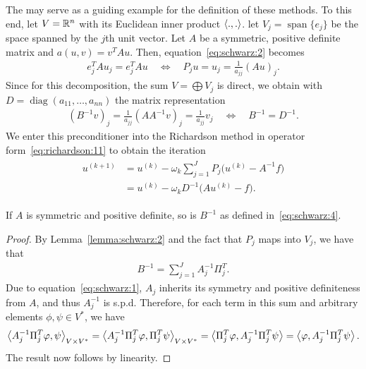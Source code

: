 \begin{example}
  \label{example:schwarz:Jacobi}
  The  may serve as a guiding example for the
  definition of these methods. To this end, let $V = \mathbb R^n$ with its
  Euclidean inner product $\scal(.,.)$. let $V_j =
  \operatorname{span}\{e_j\}$ be the space spanned by the $j$th unit
  vector. Let $A$ be a symmetric, positive definite matrix and $a(u,v)
  = v^T A u$. Then, equation~\eqref{eq:schwarz:2} becomes
  \begin{gather}
    \label{eq:schwarz:27}
    e_j^T A u_j = e_j^T A u
    \quad \Leftrightarrow \quad
    P_j u = u_j = \frac1{a_{j j}}(A u)_j.
  \end{gather}
  Since for this decomposition, the sum $V=\bigoplus V_j$ is direct,
  we obtain with $D=\operatorname{diag}(a_{11},\dots,a_{n n})$ the
  matrix representation
  \begin{gather*}
    (B^{-1} v)_j = \frac1{a_{j j}}(A A^{-1} v)_j = \frac1{a_{j j}} v_j
    \quad \Leftrightarrow \quad
    B^{-1} = D^{-1}.
  \end{gather*}
  We enter this preconditioner into the Richardson method in operator
  form~\eqref{eq:richardson:11} to obtain the iteration
  \begin{gather}
    \label{eq:schwarz:28}
    \begin{split}
      u^{(k+1)} &= u^{(k)} - \omega_k \sum_{j=1}^J P_j \bigl(u^{(k)} -
      A^{-1}f\bigr)\\
      &= u^{(k)} - \omega_k D^{-1} \bigl(A u^{(k)} - f\bigr).
    \end{split}
  \end{gather}
\end{example}

\begin{lemma}
  \label{lemma:schwarz:3}
  If $A$ is symmetric and positive definite, so is $B^{-1}$ as defined
  in~\eqref{eq:schwarz:4}.
\end{lemma}

\begin{proof}
  By Lemma~\ref{lemma:schwarz:2} and the fact that $P_j$ maps into $V_j$, we have that
  \begin{gather}
    \label{eq:schwarz:16}
    B^{-1} = \sum_{j=1}^J A_j^{-1} \Pi^T_j.
  \end{gather}
  Due to equation~\eqref{eq:schwarz:1}, $A_j$ inherits its symmetry
  and positive definiteness from $A$, and thus $A_j^{-1}$ is s.p.d.
  Therefore, for each term in this sum and arbitrary elements
  $\phi,\psi\in V^*$, we have
  \begin{gather*}
    \scal(A_j^{-1} \Pi^T_j \phi, \psi)_{V\times V^*}
    = \scal(A_j^{-1} \Pi^T_j \phi, \Pi^T_j \psi)_{V\times V^*}
    = \scal(\Pi^T_j \phi, A_j^{-1}\Pi^T_j \psi)
    = \scal(\phi, A_j^{-1}\Pi^T_j \psi).
  \end{gather*}
  The result now follows by linearity.
\end{proof}

